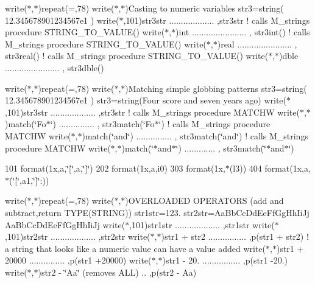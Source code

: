 write($\ast$,$\ast$)repeat(\textquotesingle{}=\textquotesingle{},78) write($\ast$,$\ast$)\textquotesingle{}Casting to numeric variables\textquotesingle{} str3=string(\textquotesingle{} 12.\+345678901234567e1 \textquotesingle{}) write($\ast$,101)\textquotesingle{}str3str ................... \textquotesingle{},str3str ! calls M\+\_\+strings procedure S\+T\+R\+I\+N\+G\+\_\+\+T\+O\+\_\+\+V\+A\+L\+U\+E() write($\ast$,$\ast$)\textquotesingle{}int ....................... \textquotesingle{}, str3int() ! calls M\+\_\+strings procedure S\+T\+R\+I\+N\+G\+\_\+\+T\+O\+\_\+\+V\+A\+L\+U\+E() write($\ast$,$\ast$)\textquotesingle{}real ....................... \textquotesingle{}, str3real() ! calls M\+\_\+strings procedure S\+T\+R\+I\+N\+G\+\_\+\+T\+O\+\_\+\+V\+A\+L\+U\+E() write($\ast$,$\ast$)\textquotesingle{}dble ....................... \textquotesingle{}, str3dble()

write($\ast$,$\ast$)repeat(\textquotesingle{}=\textquotesingle{},78) write($\ast$,$\ast$)\textquotesingle{}Matching simple globbing patterns\textquotesingle{} str3=string(\textquotesingle{} 12.\+345678901234567e1 \textquotesingle{}) str3=string(\textquotesingle{}Four score and seven years ago\textquotesingle{}) write($\ast$,101)\textquotesingle{}str3str ................... \textquotesingle{},str3str ! calls M\+\_\+strings procedure M\+A\+T\+C\+HW write($\ast$,$\ast$)\textquotesingle{}match(\char`\"{}\+Fo$\ast$\char`\"{}) ............... \textquotesingle{}, str3match(\char`\"{}\+Fo$\ast$\char`\"{}) ! calls M\+\_\+strings procedure M\+A\+T\+C\+HW write($\ast$,$\ast$)\textquotesingle{}match(\char`\"{}and\char`\"{}) ............... \textquotesingle{}, str3match(\char`\"{}and\char`\"{}) ! calls M\+\_\+strings procedure M\+A\+T\+C\+HW write($\ast$,$\ast$)\textquotesingle{}match(\char`\"{}$\ast$and$\ast$\char`\"{}) ............. \textquotesingle{}, str3match(\char`\"{}$\ast$and$\ast$\char`\"{})

101 format(1x,a,\char`\"{}\mbox{[}\char`\"{},a,\char`\"{}\mbox{]}\char`\"{}) 202 format(1x,a,i0) 303 format(1x,$\ast$(l3)) 404 format(1x,a,$\ast$(\char`\"{}\mbox{[}\char`\"{},a1,\char`\"{}\mbox{]}\char`\"{}\+:))

write($\ast$,$\ast$)repeat(\textquotesingle{}=\textquotesingle{},78) write($\ast$,$\ast$)\textquotesingle{}O\+V\+E\+R\+L\+O\+A\+D\+ED O\+P\+E\+R\+A\+T\+O\+RS (add and subtract,return T\+Y\+P\+E(\+S\+T\+R\+I\+N\+G))\textquotesingle{} str1str=\textquotesingle{}123.\textquotesingle{} str2str=\textquotesingle{}Aa\+Bb\+Cc\+Dd\+Ee\+Ff\+Gg\+Hh\+Ii\+Jj Aa\+Bb\+Cc\+Dd\+Ee\+Ff\+Gg\+Hh\+Ii\+Jj\textquotesingle{} write($\ast$,101)\textquotesingle{}str1str ................... \textquotesingle{},str1str write($\ast$,101)\textquotesingle{}str2str ................... \textquotesingle{},str2str write($\ast$,$\ast$)\textquotesingle{}str1 + str2 ................ \textquotesingle{},p(str1 + str2) ! a string that looks like a numeric value can have a value added write($\ast$,$\ast$)\textquotesingle{}str1 + 20000 ............... \textquotesingle{},p(str1 +20000) write($\ast$,$\ast$)\textquotesingle{}str1 -\/ 20. ................ \textquotesingle{},p(str1 -\/20.) write($\ast$,$\ast$)\textquotesingle{}str2 -\/ \char`\"{}\+Aa\char`\"{} (removes A\+LL) .. \textquotesingle{},p(str2 -\/ \textquotesingle{}Aa\textquotesingle{})

